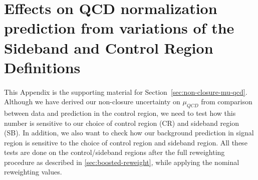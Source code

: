 \section{Effects on QCD normalization prediction from variations of the Sideband and Control Region Definitions}
\label{app:boosted-syst-CRSB_Definition_Variation}

\paragraph{}
This Appendix is the supporting material for Section~\ref{sec:non-closure-mu-qcd}. Although we have derived our non-closure uncertainty on $\mu_{QCD}$ from comparison between data and prediction in the control region, we need to test how this number is sensitive to our choice of control region (CR) and sideband region (SB). In addition, we also want to check how our background prediction in signal region is sensitive to the choice of control region and sideband region. All these tests are done on the control/sideband regions after the full reweighting procedure as described in \ref{sec:boosted-reweight}, while applying the nominal reweighting values.

